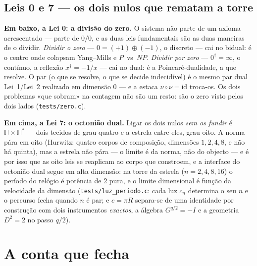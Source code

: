 \documentclass[11pt,a4paper]{article}
\newcommand{\code}[1]{\texttt{\small #1}}
\newcommand{\dg}{^{\dagger}}
\begin{document}
\subsection{Leis 0 e 7 --- os dois nulos que rematam a torre}\label{sub:zero}

\textbf{Em baixo, a Lei 0: a divisão do zero.} O sistema não parte de um axioma acrescentado ---
parte de $0/0$, e as duas leis fundamentais são as duas maneiras de o dividir. \emph{Dividir o zero}
--- $0=(+1)\oplus(-1)$, o discreto --- cai no bidual: é o centro onde colapsam Yang--Mills e
$P$~vs~$NP$. \emph{Dividir por zero} --- $0\dg=\infty$, o contínuo, a reflexão $x\dg=-1/x$ --- cai
no dual: é a Poincaré-dualidade, a que resolve. O par (o que se resolve, o que se decide indecidível)
é o mesmo par dual Lei~1/Lei~2 realizado em dimensão $0$ --- e a estaca $\nu\circ\nu=\mathrm{id}$
troca-os. Os dois problemas «que sobram» na contagem não são um resto: são o zero visto pelos dois
lados (\code{tests/zero.c}).

\textbf{Em cima, a Lei 7: o octonião dual.} Ligar os dois nulos \emph{sem os fundir} é
$\mathbb H\times\mathbb H^{*}$ --- dois tecidos de grau quatro e a estrela entre eles, grau oito. A
norma pára em oito (Hurwitz: quatro corpos de composição, dimensões $1,2,4,8$, e não há quinta), mas
a estrela não pára --- o limite é da norma, não do objecto --- e é por isso que as oito leis se
reaplicam ao corpo que constroem, e a interface do octonião dual segue em alta dimensão: na torre da
estrela ($n=2,4,8,16$) o período do relógio é potência de $2$ pura, e o limite dimensional é função
da velocidade da dimensão (\code{tests/luz\_periodo.c}: cada luz $c_n$ determina o seu $n$ e o
percurso fecha quando $n$ é par; e $c=\pi R$ separa-se de uma identidade por construção com dois
instrumentos \emph{exactos}, a álgebra $G^{q/2}=-I$ e a geometria $D^{2}=2$ no passo $q/2$).

\section{A conta que fecha}\label{sec:conta}
\end{document}
